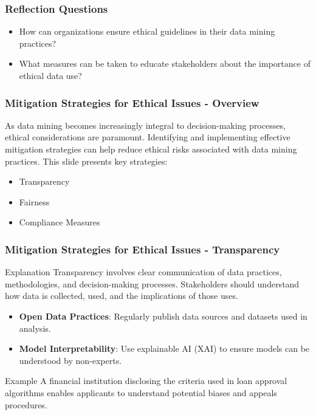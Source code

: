 \documentclass[aspectratio=169]{beamer}
\begin{document}
\begin{frame}[fragile]
  \frametitle{Reflection Questions}
  \begin{itemize}
    \item How can organizations ensure ethical guidelines in their data mining practices?
    \item What measures can be taken to educate stakeholders about the importance of ethical data use?
  \end{itemize}
\end{frame}

\begin{frame}[fragile]
    \frametitle{Mitigation Strategies for Ethical Issues - Overview}
    As data mining becomes increasingly integral to decision-making processes, ethical considerations are paramount. 
    Identifying and implementing effective mitigation strategies can help reduce ethical risks associated with data mining practices. 
    This slide presents key strategies: 
    \begin{itemize}
        \item Transparency
        \item Fairness
        \item Compliance Measures
    \end{itemize}
\end{frame}

\begin{frame}[fragile]
    \frametitle{Mitigation Strategies for Ethical Issues - Transparency}
    \begin{block}{Explanation}
        Transparency involves clear communication of data practices, methodologies, and decision-making processes. 
        Stakeholders should understand how data is collected, used, and the implications of those uses.
    \end{block}

    \begin{itemize}
        \item \textbf{Open Data Practices}: Regularly publish data sources and datasets used in analysis.
        \item \textbf{Model Interpretability}: Use explainable AI (XAI) to ensure models can be understood by non-experts.
    \end{itemize}
    
    \begin{block}{Example}
        A financial institution disclosing the criteria used in loan approval algorithms enables applicants to understand potential biases and appeals procedures.
    \end{block}
\end{frame}
\end{document}
